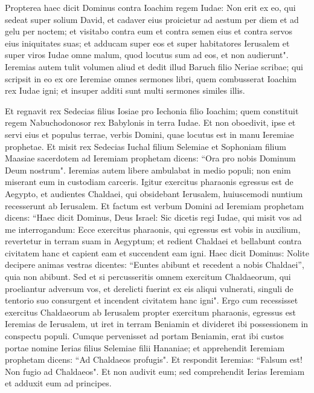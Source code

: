 \begin{biblechapter}
\verse Propterea haec dicit Dominus contra Ioachim regem Iudae: Non erit ex eo, qui sedeat super solium David, et cadaver eius proicietur ad aestum per diem et ad gelu per noctem;  
\verse et visitabo contra eum et contra semen eius et contra servos eius iniquitates suas; et adducam super eos et super habitatores Ierusalem et super viros Iudae omne malum, quod locutus sum ad eos, et non audierunt". 
\verse Ieremias autem tulit volumen aliud et dedit illud Baruch filio Neriae scribae; qui scripsit in eo ex ore Ieremiae omnes sermones libri, quem combusserat Ioachim rex Iudae igni; et insuper additi sunt multi sermones similes illis. 
\end{biblechapter}

\begin{biblechapter}  
\verse Et regnavit rex Sedecias filius Iosiae pro Iechonia filio Ioachim; quem constituit regem Nabuchodonosor rex Babylonis in terra Iudae. 
\verse Et non oboedivit, ipse et servi eius et populus terrae, verbis Domini, quae locutus est in manu Ieremiae prophetae. 
\verse Et misit rex Sedecias Iuchal filium Selemiae et Sophoniam filium Maasiae sacerdotem ad Ieremiam prophetam dicens: “Ora pro nobis Dominum Deum nostrum".  
\verse Ieremias autem libere ambulabat in medio populi; non enim miserant eum in custodiam carceris. 
\verse Igitur exercitus pharaonis egressus est de Aegypto, et audientes Chaldaei, qui obsidebant Ierusalem, huiuscemodi nuntium recesserunt ab Ierusalem. 
\verse Et factum est verbum Domini ad Ieremiam prophetam dicens: 
\verse “Haec dicit Dominus, Deus Israel: Sic dicetis regi Iudae, qui misit vos ad me interrogandum: Ecce exercitus pharaonis, qui egressus est vobis in auxilium, revertetur in terram suam in Aegyptum; 
\verse et redient Chaldaei et bellabunt contra civitatem hanc et capient eam et succendent eam igni. 
\verse Haec dicit Dominus: Nolite decipere animas vestras dicentes: “Euntes abibunt et recedent a nobis Chaldaei”, quia non abibunt. 
\verse Sed et si percusseritis omnem exercitum Chaldaeorum, qui proeliantur adversum vos, et derelicti fuerint ex eis aliqui vulnerati, singuli de tentorio suo consurgent et incendent civitatem hanc igni". 
\verse Ergo cum recessisset exercitus Chaldaeorum ab Ierusalem propter exercitum pharaonis, 
\verse egressus est Ieremias de Ierusalem, ut iret in terram Beniamin et divideret ibi possessionem in conspectu populi. 
\verse Cumque pervenisset ad portam Beniamin, erat ibi custos portae nomine Ierias filius Selemiae filii Hananiae; et apprehendit Ieremiam prophetam dicens: “Ad Chaldaeos profugis".  
\verse Et respondit Ieremias: “Falsum est! Non fugio ad Chaldaeos". Et non audivit eum; sed comprehendit Ierias Ieremiam et adduxit eum ad principes. 

\end{biblechapter}
